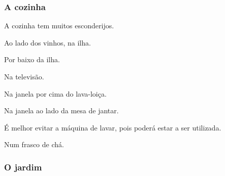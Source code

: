 \subsubsection{A cozinha}
A cozinha tem muitos esconderijos.

Ao lado dos vinhos, na ilha.

Por baixo da ilha.

Na televisão.

Na janela por cima do lava-loiça.

Na janela ao lado da mesa de jantar.

É melhor evitar a máquina de lavar, pois poderá estar a ser utilizada.

Num frasco de chá.

\subsubsection{O jardim}

